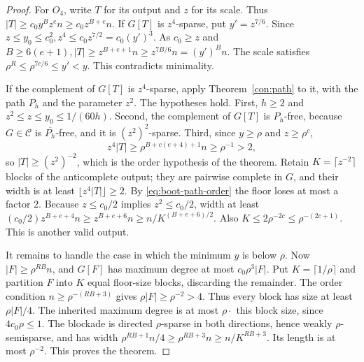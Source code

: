 \documentclass[11pt,a4paper]{article}
\theoremstyle{definition}
\theoremstyle{remark}
\numberwithin{equation}{section}
\begin{document}
\begin{proof}
For \(O_{4}\), write \(T\) for its output and \(z\) for its scale. Thus \(|T|\ge\allowbreak c_{0} y^{B} z^{e} n\ge\allowbreak c_{0} z^{B+e}n\). If \(G[T]\) is \(z^{4}\)-sparse, put \(y'=z^{7/6}\). Since \(z\le\allowbreak y_{0}\le\allowbreak c_{0}^{2},\allowbreak  z^{4}\le\allowbreak c_{0} z^{7/2}=c_{0}(y')^{3}\). As \(c_{0}\ge\allowbreak z\) and \(B\ge\allowbreak 6(e+1),\allowbreak  |T|\ge\allowbreak z^{B+e+1}n\ge\allowbreak z^{7B/6}n=(y')^{B} n\). The scale satisfies \(\rho^{R}\le\allowbreak \rho^{7c/6}\le\allowbreak y'<y\). This contradicts minimality.

If the complement of \(G[T]\) is \(z^{4}\)-sparse, apply Theorem~\ref{con:path} to it, with the path \(P_{h}\) and the parameter \(z^{2}\). The hypotheses hold. First, \(h\ge2\) and \(z^{2}\le z\le y_{0}\le 1/(60h)\). Second, the complement of \(G[T]\) is \(P_{h}\)-free, because \(G\in\mathcal C\) is \(\overline{P_{h}}\)-free, and it is \((z^{2})^{2}\)-sparse. Third, since \(y\ge \rho\) and \(z\ge \rho^{c}\),
\begin{equation}\label{eq:boot-path-order}
 z^{4}|T|\ge \rho^{B+c(e+4)+1}n\ge \rho^{-1}>2,
\end{equation}
so \(|T|\ge (z^{2})^{-2}\), which is the order hypothesis of the theorem. Retain \(K=\lceil z^{-2}\rceil\) blocks of the anticomplete output; they are pairwise complete in \(G\), and their width is at least \(\lfloor z^{4}|T|\rfloor\ge2\). By \eqref{eq:boot-path-order} the floor loses at most a factor \(2\). Because \(z\le\allowbreak c_{0}/2\) implies \(z^{2}\le\allowbreak c_{0}/2\), width at least \((c_{0}/2)z^{B+e+4}n\ge\allowbreak z^{B+e+6}n \ge\allowbreak n/K^{(B+e+6)/2}\). Also \(K\le\allowbreak 2\rho^{-2c}\le\allowbreak \rho^{-(2c+1)}\). This is another valid output.

It remains to handle the case in which the minimum \(y\) is below \(\rho\). Now \(|F|\ge\allowbreak \rho^{RB}n\), and \(G[F]\) has maximum degree at most \(c_{0} \rho^{3}|F|\). Put \(K=\lceil 1/\rho\rceil\) and partition \(F\) into \(K\) equal floor-size blocks, discarding the remainder. The order condition \(n\ge\allowbreak \rho^{-(RB+3)}\) gives \(\rho|F|\ge\allowbreak \rho^{-2}>4\). Thus every block has size at least \(\rho|F|/4\). The inherited maximum degree is at most \(\rho \cdot \) this block size, since \(4c_{0} \rho\le\allowbreak 1\). The blockade is directed \(\rho\)-sparse in both directions, hence weakly \(\rho\)-semisparse, and has width \(\rho^{RB+1}n/4\ge\allowbreak \rho^{RB+3}n\ge\allowbreak n/K^{RB+3}\). Its length is at most \(\rho^{-2}\). This proves the theorem.
\end{proof}
\end{document}
